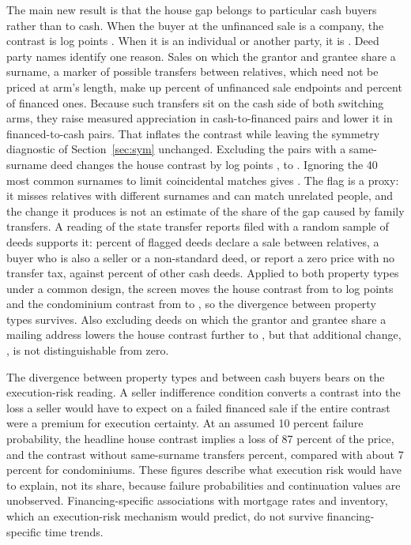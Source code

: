 \documentclass[12pt]{article}
\begin{document}
The main new result is that the house gap belongs to particular cash buyers rather than to cash. When the buyer at the unfinanced sale is a company, the contrast is \CompanyCash{} log points \CompanyCashCI{}. When it is an individual or another party, it is \OtherCash{} \OtherCashCI{}. Deed party names identify one reason. Sales on which the grantor and grantee share a surname, a marker of possible transfers between relatives, which need not be priced at arm's length, make up \RelShareCash{} percent of unfinanced sale endpoints and \RelShareFin{} percent of financed ones. Because such transfers sit on the cash side of both switching arms, they raise measured appreciation in cash-to-financed pairs and lower it in financed-to-cash pairs. That inflates the contrast while leaving the symmetry diagnostic of Section~\ref{sec:sym} unchanged. Excluding the \RelPairs{} pairs with a same-surname deed changes the house contrast by \NoRelChange{} log points \NoRelChangeCI{}, to \NoRelOLS{} \NoRelOLSCI{}. Ignoring the 40 most common surnames to limit coincidental matches gives \NoRelStrictOLS{} \NoRelStrictOLSCI{}. The flag is a proxy: it misses relatives with different surnames and can match unrelated people, and the change it produces is not an estimate of the share of the gap caused by family transfers. A reading of the state transfer reports filed with a random sample of deeds supports it: \DeedShare{} percent of flagged deeds \DeedCI{} declare a sale between relatives, a buyer who is also a seller or a non-standard deed, or report a zero price with no transfer tax, against \DeedUShare{} percent \DeedUCI{} of other cash deeds. Applied to both property types under a common design, the screen moves the house contrast from \InitialGap{} to \HouseBQNoRel{} log points and the condominium contrast from \CondoGap{} to \CondoNoRel{} \CondoNoRelCI{}, so the divergence between property types survives. Also excluding deeds on which the grantor and grantee share a mailing address lowers the house contrast further to \AddrOLS{}, but that additional change, \AddrChange{} \AddrChangeCI{}, is not distinguishable from zero.

The divergence between property types and between cash buyers bears on the execution-risk reading. A seller indifference condition converts a contrast into the loss a seller would have to expect on a failed financed sale if the entire contrast were a premium for execution certainty. At an assumed 10 percent failure probability, the headline house contrast implies a loss of 87 percent of the price, and the contrast without same-surname transfers \NoRelInvQTen{} percent, compared with about 7 percent for condominiums. These figures describe what execution risk would have to explain, not its share, because failure probabilities and continuation values are unobserved. Financing-specific associations with mortgage rates and inventory, which an execution-risk mechanism would predict, do not survive financing-specific time trends.
\end{document}
